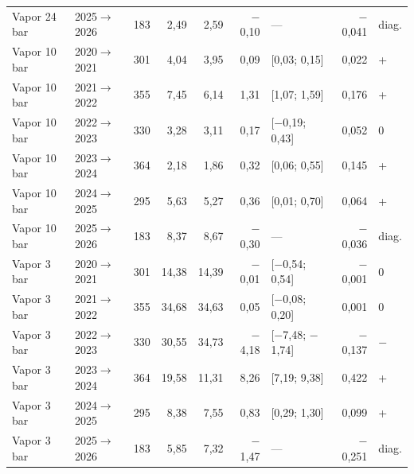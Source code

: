 {\begin{xltabular}{\linewidth}{@{}llrrrrlrl@{}}
Vapor 24 bar & 2025$\to$2026 & 183 & 2,49 & 2,59 & $-$0,10 & --- & $-$0,041 & diag. \\
Vapor 10 bar & 2020$\to$2021 & 301 & 4,04 & 3,95 & 0,09 & [0,03; 0,15] & 0,022 & + \\
Vapor 10 bar & 2021$\to$2022 & 355 & 7,45 & 6,14 & 1,31 & [1,07; 1,59] & 0,176 & + \\
Vapor 10 bar & 2022$\to$2023 & 330 & 3,28 & 3,11 & 0,17 & [$-$0,19; 0,43] & 0,052 & 0 \\
Vapor 10 bar & 2023$\to$2024 & 364 & 2,18 & 1,86 & 0,32 & [0,06; 0,55] & 0,145 & + \\
Vapor 10 bar & 2024$\to$2025 & 295 & 5,63 & 5,27 & 0,36 & [0,01; 0,70] & 0,064 & + \\
Vapor 10 bar & 2025$\to$2026 & 183 & 8,37 & 8,67 & $-$0,30 & --- & $-$0,036 & diag. \\
Vapor 3 bar & 2020$\to$2021 & 301 & 14,38 & 14,39 & $-$0,01 & [$-$0,54; 0,54] & $-$0,001 & 0 \\
Vapor 3 bar & 2021$\to$2022 & 355 & 34,68 & 34,63 & 0,05 & [$-$0,08; 0,20] & 0,001 & 0 \\
Vapor 3 bar & 2022$\to$2023 & 330 & 30,55 & 34,73 & $-$4,18 & [$-$7,48; $-$1,74] & $-$0,137 & $-$ \\
Vapor 3 bar & 2023$\to$2024 & 364 & 19,58 & 11,31 & 8,26 & [7,19; 9,38] & 0,422 & + \\
Vapor 3 bar & 2024$\to$2025 & 295 & 8,38 & 7,55 & 0,83 & [0,29; 1,30] & 0,099 & + \\
Vapor 3 bar & 2025$\to$2026 & 183 & 5,85 & 7,32 & $-$1,47 & --- & $-$0,251 & diag. \\
\end{xltabular}
}
